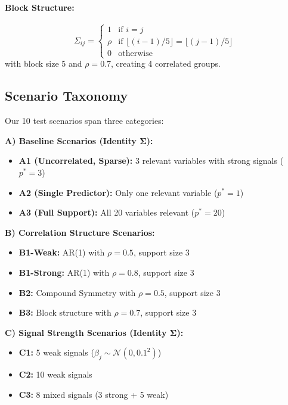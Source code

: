 \documentclass[11pt,a4paper]{article}
\begin{document}
\paragraph{Block Structure:}
\begin{equation}
\Sigma_{ij} = \begin{cases}
1 & \text{if } i = j \\
\rho & \text{if } \lfloor (i-1)/5 \rfloor = \lfloor (j-1)/5 \rfloor \\
0 & \text{otherwise}
\end{cases}
\end{equation}
with block size 5 and $\rho = 0.7$, creating 4 correlated groups.

\subsection{Scenario Taxonomy}

Our 10 test scenarios span three categories:

\textbf{A) Baseline Scenarios (Identity $\mathbf{\Sigma}$):}
\begin{itemize}
\item \textbf{A1 (Uncorrelated, Sparse):} 3 relevant variables with strong signals ($p^* = 3$)
\item \textbf{A2 (Single Predictor):} Only one relevant variable ($p^* = 1$)
\item \textbf{A3 (Full Support):} All 20 variables relevant ($p^* = 20$)
\end{itemize}

\textbf{B) Correlation Structure Scenarios:}
\begin{itemize}
\item \textbf{B1-Weak:} AR(1) with $\rho = 0.5$, support size 3
\item \textbf{B1-Strong:} AR(1) with $\rho = 0.8$, support size 3
\item \textbf{B2:} Compound Symmetry with $\rho = 0.5$, support size 3
\item \textbf{B3:} Block structure with $\rho = 0.7$, support size 3
\end{itemize}

\textbf{C) Signal Strength Scenarios (Identity $\mathbf{\Sigma}$):}
\begin{itemize}
\item \textbf{C1:} 5 weak signals ($\beta_j \sim \mathcal{N}(0, 0.1^2)$)
\item \textbf{C2:} 10 weak signals
\item \textbf{C3:} 8 mixed signals (3 strong + 5 weak)
\end{itemize}
\end{document}
